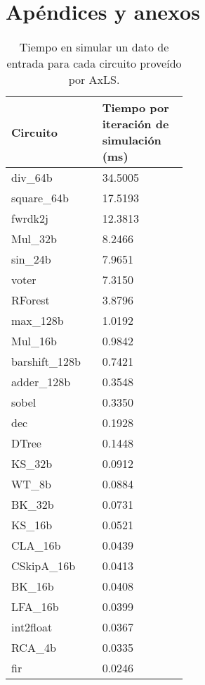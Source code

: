 \chapter{Apéndices y anexos}

\begin{table}[ht]
  \centering
  \caption{Tiempo en simular un dato de entrada para cada circuito proveído por AxLS.}
  \label{tab:timing_info}
  \begin{tabular}{M{0.2\linewidth}M{0.3\linewidth}}
    \toprule
    Circuito & Tiempo por iteración de simulación (\si{\milli\second}) \\
    \midrule
    div\_64b &        34.5005      \\
    square\_64b &      17.5193      \\
    fwrdk2j &          12.3813      \\
    Mul\_32b &        8.2466      \\
    sin\_24b &        7.9651      \\
    voter &            7.3150      \\
    RForest &          3.8796      \\
    max\_128b &        1.0192      \\
    Mul\_16b &        0.9842      \\
    barshift\_128b &  0.7421      \\
    adder\_128b &      0.3548      \\
    sobel &            0.3350      \\
    dec &              0.1928      \\
    DTree &            0.1448      \\
    KS\_32b &          0.0912      \\
    WT\_8b &          0.0884      \\
    BK\_32b &          0.0731      \\
    KS\_16b &          0.0521      \\
    CLA\_16b &        0.0439      \\
    CSkipA\_16b &      0.0413      \\
    BK\_16b &          0.0408      \\
    LFA\_16b &        0.0399      \\
    int2float &        0.0367      \\
    RCA\_4b &          0.0335      \\
    fir &              0.0246      \\
    \bottomrule
  \end{tabular}
\end{table}


